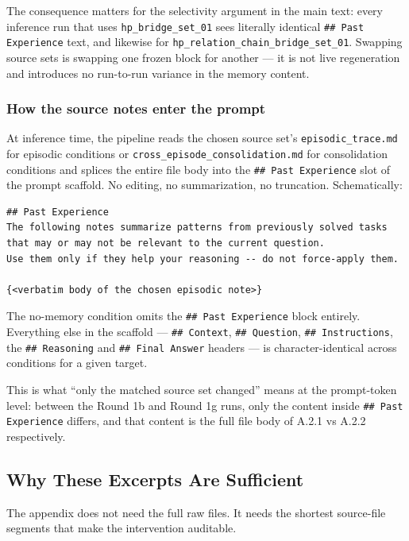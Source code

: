 The consequence matters for the selectivity argument in the main text: every inference run that uses \texttt{hp\_bridge\_set\_01} sees literally identical \texttt{\#\# Past Experience} text, and likewise for \texttt{hp\_relation\_chain\_bridge\_set\_01}. Swapping source sets is swapping one frozen block for another --- it is not live regeneration and introduces no run-to-run variance in the memory content.

\subsubsection{How the source notes enter the prompt}

At inference time, the pipeline reads the chosen source set's \texttt{episodic\_trace.md} for episodic conditions or \texttt{cross\_episode\_consolidation.md} for consolidation conditions and splices the entire file body into the \texttt{\#\# Past Experience} slot of the prompt scaffold. No editing, no summarization, no truncation. Schematically:

\begin{lstlisting}
## Past Experience
The following notes summarize patterns from previously solved tasks
that may or may not be relevant to the current question.
Use them only if they help your reasoning -- do not force-apply them.

{<verbatim body of the chosen episodic note>}
\end{lstlisting}

The no-memory condition omits the \texttt{\#\# Past Experience} block entirely. Everything else in the scaffold --- \texttt{\#\# Context}, \texttt{\#\# Question}, \texttt{\#\# Instructions}, the \texttt{\#\# Reasoning} and \texttt{\#\# Final Answer} headers --- is character-identical across conditions for a given target.

This is what ``only the matched source set changed'' means at the prompt-token level: between the Round 1b and Round 1g runs, only the content inside \texttt{\#\# Past Experience} differs, and that content is the full file body of A.2.1 vs A.2.2 respectively.

\subsection{Why These Excerpts Are Sufficient}

The appendix does not need the full raw files. It needs the shortest source-file segments that make the intervention auditable.

